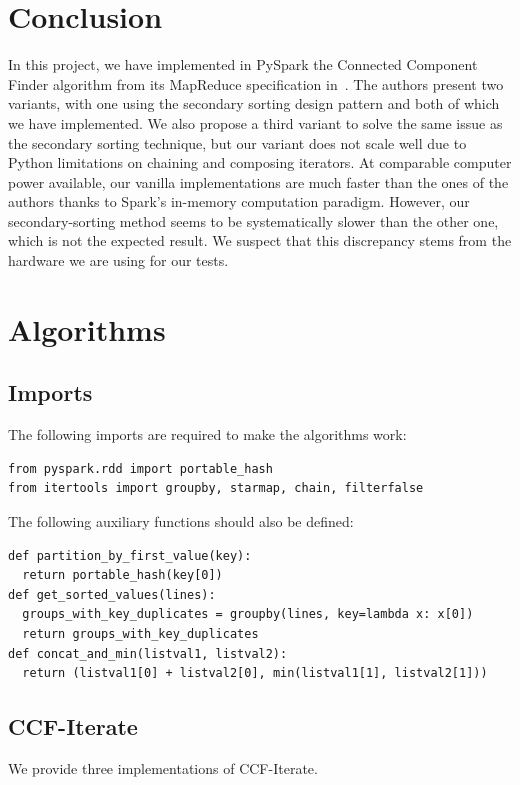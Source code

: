 \documentclass[a4paper,12pt]{article}
\begin{document}
\section{Conclusion}
In this project, we have implemented in PySpark the Connected Component Finder algorithm from its MapReduce specification in~\cite{kardes2014ccf}. The authors present two variants, with one using the secondary sorting design pattern and both of which we have implemented. We also propose a third variant to solve the same issue as the secondary sorting technique, but our variant does not scale well due to Python limitations on chaining and composing iterators. At comparable computer power available, our vanilla implementations are much faster than the ones of the authors thanks to Spark's in-memory computation paradigm. However, our secondary-sorting method seems to be systematically slower than the other one, which is not the expected result. We suspect that this discrepancy stems from the hardware we are using for our tests.
\appendix
\section{Algorithms}
\label{pos:algorithms}
\subsection{Imports}
The following imports are required to make the algorithms work:
\begin{verbatim}
from pyspark.rdd import portable_hash
from itertools import groupby, starmap, chain, filterfalse
\end{verbatim}
The following auxiliary functions should also be defined:
\begin{verbatim}
def partition_by_first_value(key):
  return portable_hash(key[0])
def get_sorted_values(lines):
  groups_with_key_duplicates = groupby(lines, key=lambda x: x[0])
  return groups_with_key_duplicates
def concat_and_min(listval1, listval2):
  return (listval1[0] + listval2[0], min(listval1[1], listval2[1]))
\end{verbatim}
\subsection{CCF-Iterate}
We provide three implementations of CCF-Iterate.
\end{document}
